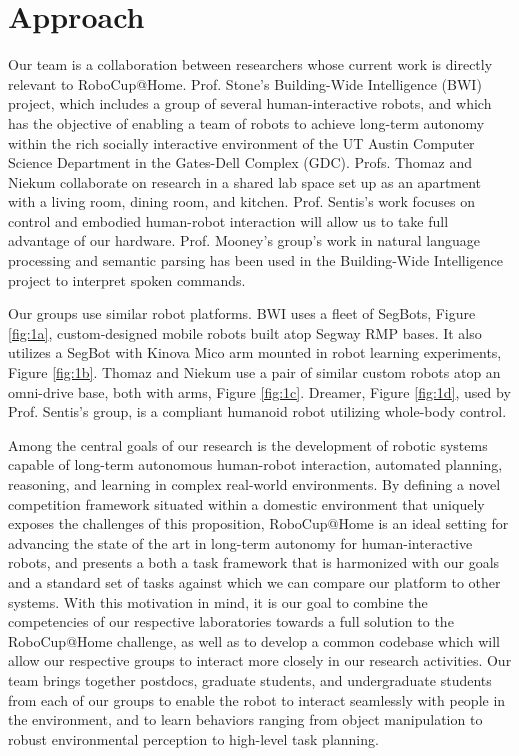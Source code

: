 \section{Approach}
Our team is a collaboration between researchers whose current work is directly relevant to RoboCup@Home. Prof. Stone's Building-Wide Intelligence (BWI) project, which includes a group of several human-interactive robots, and which has the objective of enabling a team of robots to achieve long-term autonomy within the rich socially interactive environment of the UT Austin Computer Science Department in the Gates-Dell Complex (GDC). Profs. Thomaz and Niekum collaborate on research in a shared lab space set up as an apartment with a living room, dining room, and kitchen. Prof. Sentis's work focuses on control and embodied human-robot interaction will allow us to take full advantage of our hardware. Prof. Mooney's group's work in natural language processing and semantic parsing has been used in the Building-Wide Intelligence project to interpret spoken commands.

Our groups use similar robot platforms. BWI uses a fleet of SegBots, Figure \ref{fig:1a}, custom-designed mobile robots built atop Segway RMP bases. It also utilizes a SegBot with Kinova Mico arm mounted in robot learning experiments, Figure \ref{fig:1b}. Thomaz and Niekum use a pair of similar custom robots atop an omni-drive base, both with arms, Figure \ref{fig:1c}. Dreamer, Figure \ref{fig:1d}, used by Prof. Sentis's group, is a compliant humanoid robot utilizing whole-body control.





Among the central goals of our research is the development of robotic systems capable of long-term autonomous human-robot interaction, automated planning, reasoning, and learning in complex real-world environments. By defining a novel competition framework situated within a domestic environment that uniquely exposes the challenges of this proposition, RoboCup@Home is an ideal setting for advancing the state of the art in long-term autonomy for human-interactive robots, and presents a both a task framework that is harmonized with our goals and a standard set of tasks against which we can compare our platform to other systems. With this motivation in mind, it is our goal to combine the competencies of our respective laboratories towards a full solution to the RoboCup@Home challenge, as well as to develop a common codebase which will allow our respective groups to interact more closely in our research activities. Our team brings together postdocs, graduate students, and undergraduate students from each of our groups to enable the robot to interact seamlessly with people in the environment, and to learn behaviors ranging from object manipulation to robust environmental perception to high-level task planning.

